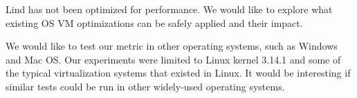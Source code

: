 Lind has not been optimized for performance. 
We would like to explore what existing OS VM optimizations can be safely applied
and their impact.

We would like to test our metric in other operating systems, such as Windows and Mac OS.
Our experiments were limited to Linux kernel 3.14.1 and some of the typical virtualization systems that existed in Linux.
It would be interesting
if similar tests could be run in other widely-used operating systems. 
